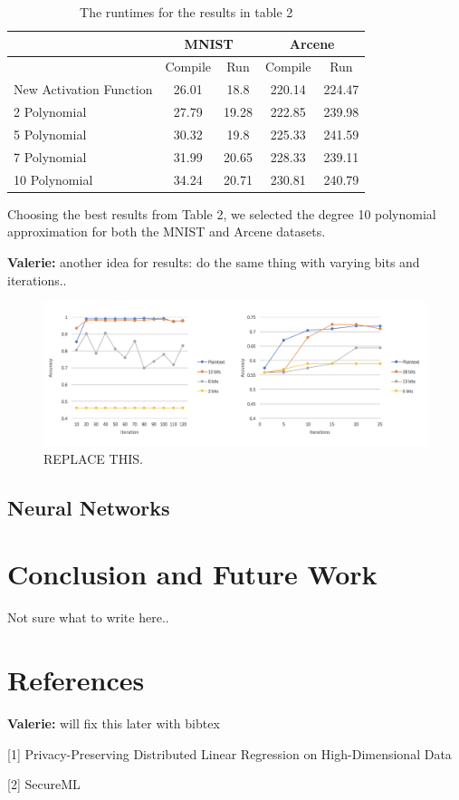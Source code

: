 \documentclass{article}
\theoremstyle{plain}
\theoremstyle{definition}
\theoremstyle{remark}
\newcommand{\vc}[1]{{\textcolor{lred}{\textbf{Valerie:} #1}}}
\begin{document}
\begin{table}[H]
\centering
\label{my-label}
\begin{tabular}{@{}lcccc@{}}
\toprule
                        & \multicolumn{2}{c}{MNIST} & \multicolumn{2}{c}{Arcene} \\ \midrule
                        & Compile      & Run        & Compile      & Run         \\
New Activation Function & 26.01        & 18.8       & 220.14       & 224.47      \\
2 Polynomial            & 27.79        & 19.28      & 222.85       & 239.98      \\
5 Polynomial            & 30.32        & 19.8       & 225.33       & 241.59      \\
7 Polynomial            & 31.99        & 20.65      & 228.33       & 239.11      \\
10 Polynomial           & 34.24        & 20.71      & 230.81       & 240.79      \\ \bottomrule
\end{tabular}
\caption{The runtimes for the results in table 2}
\end{table}

Choosing the best results from Table 2, we selected the degree 10 polynomial approximation for both the MNIST and Arcene datasets. 

\vc{another idea for results: do the same thing with varying bits and iterations.. }

\begin{figure}[H]
\centering
  \includegraphics[scale=0.6]{mnistarcene.png}
  \caption{REPLACE THIS.}
  \label{fig:result4}
\end{figure}

\subsection{Neural Networks}

\section{Conclusion and Future Work}

Not sure what to write here..

\section{References}

\vc{will fix this later with bibtex}

[1] Privacy-Preserving Distributed Linear Regression on High-Dimensional Data

[2] SecureML
\end{document}
